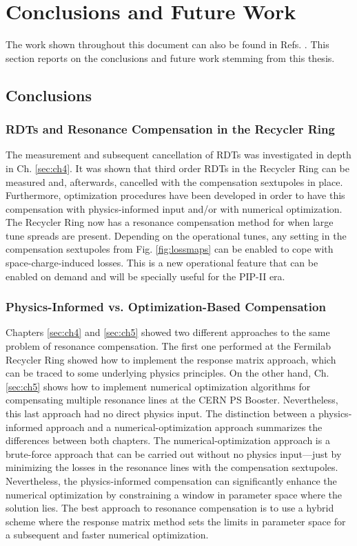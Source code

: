 \chapter{Conclusions and Future Work}
\label{sec:ch7}

The work shown throughout this document can also be found in Refs. \cite{cris1,cris2, cris3}. This section reports on the conclusions and future work stemming from this thesis.

\section{Conclusions}

\subsection{RDTs and Resonance Compensation in the Recycler Ring}

The measurement and subsequent cancellation of RDTs was investigated in depth in Ch. \ref{sec:ch4}. It was shown that third order RDTs in the Recycler Ring can be measured and, afterwards, cancelled with the compensation sextupoles in place. Furthermore, optimization procedures have been developed in order to have this compensation with physics-informed input and/or with numerical optimization. The Recycler Ring now has a resonance compensation method for when large tune spreads are present. Depending on the operational tunes, any setting in the compensation sextupoles from Fig. \ref{fig:lossmaps} can be enabled to cope with space-charge-induced losses. This is a new operational feature that can be enabled on demand and will be specially useful for the PIP-II era. 

\subsection{Physics-Informed vs. Optimization-Based Compensation}

Chapters \ref{sec:ch4} and \ref{sec:ch5} showed two different approaches to the same problem of resonance compensation. The first one performed at the Fermilab Recycler Ring showed how to implement the response matrix approach, which can be traced to some underlying physics principles. On the other hand, Ch. \ref{sec:ch5} shows how to implement numerical optimization algorithms for compensating multiple resonance lines at the CERN PS Booster. Nevertheless, this last approach had no direct physics input. The distinction between a physics-informed approach and a numerical-optimization approach summarizes the differences between both chapters. The numerical-optimization approach is a brute-force approach that can be carried out without no physics input---just by minimizing the losses in the resonance lines with the compensation sextupoles. Nevertheless, the physics-informed compensation can significantly enhance the numerical optimization by constraining a window in parameter space where the solution lies. The best approach to resonance compensation is to use a hybrid scheme where the response matrix method sets the limits in parameter space for a subsequent and faster numerical optimization. 

